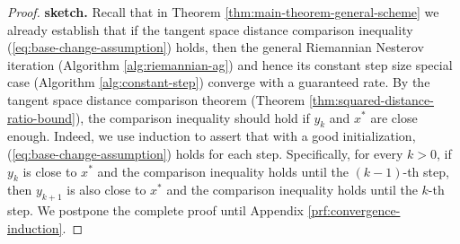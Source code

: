 \begin{proof}{\bf sketch.}
Recall that in Theorem 		\ref{thm:main-theorem-general-scheme} we already establish that if the tangent space distance comparison inequality (\ref{eq:base-change-assumption}) holds, then the general Riemannian Nesterov iteration (Algorithm \ref{alg:riemannian-ag}) and hence its constant step size special case (Algorithm \ref{alg:constant-step}) converge with a guaranteed rate. By the tangent space distance comparison theorem (Theorem \ref{thm:squared-distance-ratio-bound}), the comparison inequality should hold if $y_k$ and $x^*$ are close enough. Indeed, 
we use induction to assert that with a good initialization, (\ref{eq:base-change-assumption}) holds for each step. Specifically, for every $k>0$, if $y_k$ is close to $x^*$ and the comparison inequality holds until the $(k-1)$-th step, then $y_{k+1}$ is also close to $x^*$ and the comparison inequality holds until the $k$-th step. We postpone the complete proof until Appendix \ref{prf:convergence-induction}.

\end{proof}
